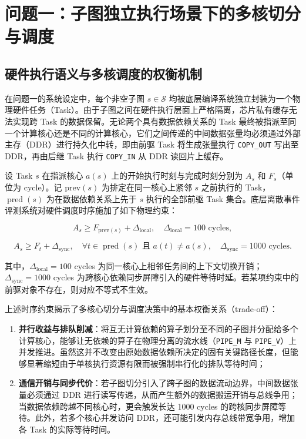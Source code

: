 \documentclass[anonymous,notoc]{gmcm2026}
\providecommand{\tightlist}{\setlength{\itemsep}{0pt}\setlength{\parskip}{0pt}}
\begin{document}
\section{问题一：子图独立执行场景下的多核切分与调度}

\subsection{硬件执行语义与多核调度的权衡机制}

在问题一的系统设定中，每个非空子图 \(s \in \mathcal{S}\) 均被底层编译系统独立封装为一个物理硬件任务（Task）。由于子图之间在硬件执行层面上严格隔离，芯片私有缓存无法实现跨 Task 的数据保留。无论两个具有数据依赖关系的 Task 最终被指派至同一个计算核心还是不同的计算核心，它们之间传递的中间数据张量均必须通过外部主存（DDR）进行持久化中转，即由前驱 Task 将生成张量执行 \texttt{COPY\_OUT} 写出至 DDR，再由后继 Task 执行 \texttt{COPY\_IN} 从 DDR 读回片上缓存。

设 Task \(s\) 在指派核心 \(a(s)\) 上的开始执行时刻与完成时刻分别为 \(A_s\) 和 \(F_s\)（单位为 cycle）。记 \(\mathrm{prev}(s)\) 为排定在同一核心上紧邻 \(s\) 之前执行的 Task，\(\operatorname{pred}(s)\) 为在数据依赖关系上先于 \(s\) 执行的全部前驱 Task 集合。底层离散事件评测系统对硬件调度时序施加了如下物理约束：

\begin{equation}
A_s \ge F_{\mathrm{prev}(s)} + \Delta_{\mathrm{local}}, \quad \Delta_{\mathrm{local}} = 100 \text{ cycles},
\end{equation}

\begin{equation}
A_s \ge F_t + \Delta_{\mathrm{sync}}, \quad \forall t \in \operatorname{pred}(s) \text{ 且 } a(t) \ne a(s), \quad \Delta_{\mathrm{sync}} = 1000 \text{ cycles}.
\end{equation}

其中，\(\Delta_{\mathrm{local}} = 100\) cycles 为同一核心上相邻任务间的上下文切换开销；\(\Delta_{\mathrm{sync}} = 1000\) cycles 为跨核心依赖同步屏障引入的硬件等待时延。若某项约束中的前驱对象不存在，则对应不等式不生效。

上述时序约束揭示了多核心切分与调度决策中的基本权衡关系（trade-off）：

\begin{enumerate}
\def\labelenumi{\arabic{enumi}.}
\tightlist
\item
  \textbf{并行收益与排队削减}：将互无计算依赖的算子划分至不同的子图并分配给多个计算核心，能够让无依赖的算子在物理分离的流水线（\texttt{PIPE\_M} 与 \texttt{PIPE\_V}）上并发推进。虽然这并不改变由原始数据依赖所决定的固有关键路径长度，但能够显著缩短由于单核执行资源有限而被强制串行化的排队等待时间；
\item
  \textbf{通信开销与同步代价}：若子图切分引入了跨子图的数据流动边界，中间数据张量必须通过 DDR 进行读写传递，从而产生额外的数据搬运开销与总线争用；当数据依赖跨越不同核心时，更会触发长达 1000 cycles 的跨核同步屏障等待。此外，若多个核心并发访问 DDR，还可能引发内存总线带宽争用，增加各 Task 的实际等待时间。
\end{enumerate}
\end{document}
